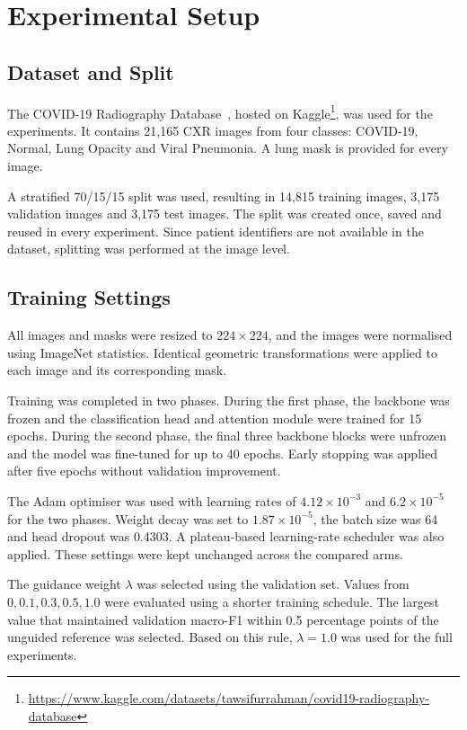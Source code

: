 \documentclass[sigconf,screen,nonacm]{acmart}
\begin{document}
\section{Experimental Setup}

\subsection{Dataset and Split}

The COVID-19 Radiography Database~\cite{chowdhury2020covidradiography, rahman2021enhancement}, hosted on Kaggle\footnote{\url{https://www.kaggle.com/datasets/tawsifurrahman/covid19-radiography-database}}, was used for the experiments. It contains 21,165 CXR images from four classes: COVID-19, Normal, Lung Opacity and Viral Pneumonia. A lung mask is provided for every image.

A stratified 70/15/15 split was used, resulting in 14,815 training images, 3,175 validation images and 3,175 test images. The split was created once, saved and reused in every experiment. Since patient identifiers are not available in the dataset, splitting was performed at the image level.

\subsection{Training Settings}

All images and masks were resized to $224\times224$, and the images were normalised using ImageNet statistics. Identical geometric transformations were applied to each image and its corresponding mask.

Training was completed in two phases. During the first phase, the backbone was frozen and the classification head and attention module were trained for 15 epochs. During the second phase, the final three backbone blocks were unfrozen and the model was fine-tuned for up to 40 epochs. Early stopping was applied after five epochs without validation improvement.

The Adam optimiser was used with learning rates of $4.12\times10^{-3}$ and $6.2\times10^{-5}$ for the two phases. Weight decay was set to $1.87\times10^{-5}$, the batch size was 64 and head dropout was 0.4303. A plateau-based learning-rate scheduler was also applied. These settings were kept unchanged across the compared arms.

The guidance weight $\lambda$ was selected using the validation set. Values from ${0,0.1,0.3,0.5,1.0}$ were evaluated using a shorter training schedule. The largest value that maintained validation macro-F1 within 0.5 percentage points of the unguided reference was selected. Based on this rule, $\lambda=1.0$ was used for the full experiments.
\end{document}
